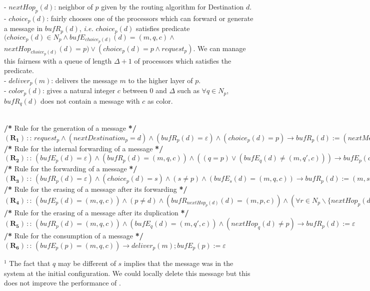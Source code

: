 \documentclass[11pt]{article}
\begin{document}
\begin{algorithm}
{\begin{description}
- $nextHop_{p}(d)$: neighbor of $p$ given by the routing algorithm for Destination $d$.\\
- $choice_{p}(d)$: fairly chooses one of the processors which can forward or generate a message in $bufR_{p}(d)$, \emph{i.e.} $choice_{p}(d)$ satisfies predicate $(choice_{p}(d)\in N_{p}\wedge bufE_{choice_{p}(d)}(d)=(m,q,c)\wedge$ $nextHop_{choice_{p}(d)}(d)=p)\vee (choice_{p}(d)=p\wedge request_{p})$. We can manage this fairness with a queue of length $\Delta+1$ of processors which satisfies the predicate.\\
- $deliver{}_{p}(m)$: delivers the message $m$ to the higher layer of $p$.\\
- $color_{p}(d)$: gives a natural integer $c$ between $0$ and $\Delta$ such as $\forall q\in N_{p}$, $bufR_{q}(d)$ does not contain a message with $c$ as color.
\item [Rules:] ~\\
\textbf{/{*}} Rule for the generation of a message \textbf{{*}/}\\
$\boldsymbol{(R_{1})\,}::\, request_{p}\wedge(nextDestination_{p}=d)\wedge(bufR_{p}(d)=\varepsilon)\wedge(choice_{p}(d)=p)\longrightarrow bufR_{p}(d):=(nextMessage_{p},p,0);request_{p}:=false$\\
\textbf{/{*}} Rule for the internal forwarding of a message \textbf{{*}/}\\
$\boldsymbol{(R_{2})}\,::\,(bufE_{p}(d)=\varepsilon)\wedge(bufR_{p}(d)=(m,q,c))\wedge((q=p)\vee(bufE_{q}(d)\neq(m,q',c)))\longrightarrow bufE_{p}(d):=(m,p,color_{p}(d));bufR_{p}(d):=\varepsilon$\\
\textbf{/{*}} Rule for the forwarding of a message \textbf{{*}/}\\
$\boldsymbol{(R_{3})}\,::\,(bufR_{p}(d)=\varepsilon)\wedge(choice_{p}(d)=s)\wedge(s\neq p)\wedge(bufE_{s}(d)=(m,q,c))\longrightarrow bufR_{p}(d):=(m,s,c)^{1}$\\
\textbf{/{*}} Rule for the erasing of a message after its forwarding
\textbf{{*}/}\\
$\boldsymbol{(R_{4})}\,::\,(bufE_{p}(d)=(m,q,c))\wedge(p\neq d)\wedge(bufR_{nextHop_{p}(d)}(d)=(m,p,c))\wedge(\forall r\in N_{p}\backslash\{nextHop_{p}(d)\},\, bufR_{r}(d)\neq(m,p,c))\longrightarrow bufE_{p}(d):=\varepsilon$\\
\textbf{/{*}} Rule for the erasing of a message after its duplication
\textbf{{*}/}\\
$\boldsymbol{(R_{5})}\,::\,(bufR_{p}(d)=(m,q,c))\wedge(bufE_{q}(d)=(m,q',c))\wedge(nextHop_{q}(d)\neq p)\longrightarrow bufR_{p}(d):=\varepsilon$\\
\textbf{/{*}} Rule for the consumption of a message \textbf{{*}/}\\
$\boldsymbol{(R_{6})}\,::\,(bufE_{p}(p)=(m,q,c))\longrightarrow deliver_{p}(m);bufE_{p}(p):=\varepsilon$
\end{description}

$^{1}$ The fact that $q$ may be different of $s$ implies that the message was in the system at the initial configuration. We could locally delete this message but this does not improve the performance of \AN.}
\end{algorithm}
\end{document}
